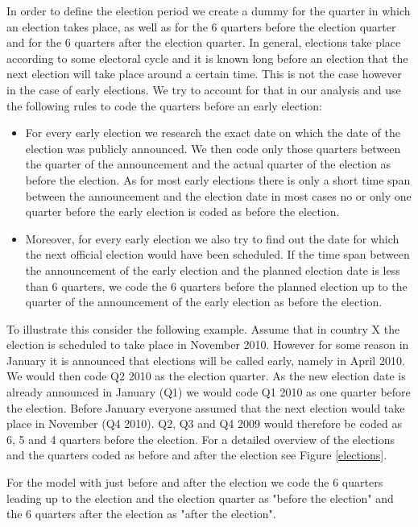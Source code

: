 \documentclass[11pt,a4paper]{scrartcl}
\begin{document}
In order to define the election period we create a dummy for the quarter in which an election takes place, as well as for the 6 quarters before the election quarter and for the 6 quarters after the election quarter. In general, elections take place according to some electoral cycle and it is known long before an election that the next election will take place around a certain time. This is not the case however in the case of early elections. We try to account for that in our analysis and use the following rules to code the quarters before an early election: 
\begin{itemize}
	\item For every early election we research the exact date on which the date of the election was publicly announced. We then code only those quarters between the quarter of the announcement and the actual quarter of the election as before the election. As for most early elections there is only a short time span between the announcement and the election date in most cases no or only one quarter before the early election is coded as before the election. 
	\item Moreover, for every early election we also try to find out the date for which the next official election would have been scheduled. If the time span between the announcement of the early election and the planned election date is less than 6 quarters, we code the 6 quarters before the planned election  up to the quarter of the announcement of the early election as before the election. 
\end{itemize} 
To illustrate this consider the following example. Assume that in country X the election is scheduled to take place in November 2010. However for some reason in January it is announced that elections will be called early, namely in April 2010. We would then code Q2 2010 as the election quarter. As the new election date is already announced in January (Q1) we would code Q1 2010 as one quarter before the election. Before January everyone assumed that the next election would take place in November (Q4 2010). Q2, Q3 and Q4 2009 would therefore be coded as 6, 5 and 4 quarters before the election. For a detailed overview of the elections and the quarters coded as before and after the election see Figure \ref{elections}.

For the model with just before and after the election we code the 6 quarters leading up to the election and the election quarter as "before the election" and the 6 quarters after the election as "after the election". 
\end{document}
